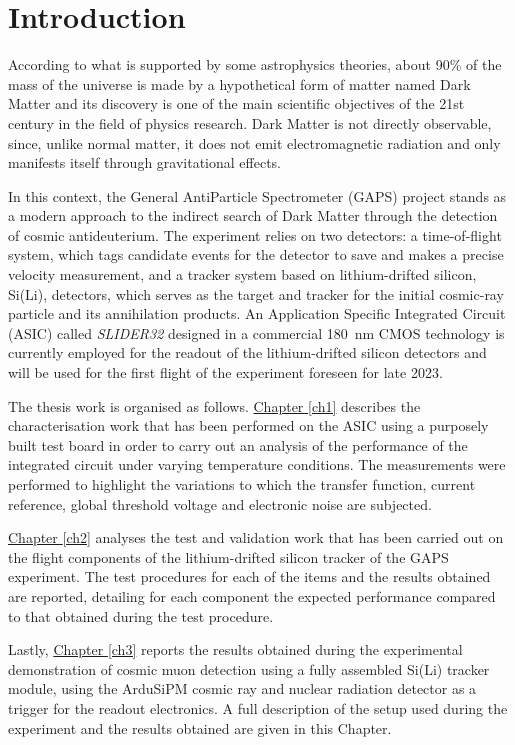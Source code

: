 \chapter*{Introduction}  %

\par
According to what is supported by some astrophysics theories, about 90\% of the mass of the universe is made by a hypothetical form of matter named Dark Matter and its discovery is one of the main scientific objectives of the 21st century in the field of physics research. Dark Matter is not directly observable, since, unlike normal matter, it does not emit electromagnetic radiation and only manifests itself through gravitational effects. 

\par
In this context, the General AntiParticle Spectrometer (GAPS) project stands as a modern approach to the indirect search of Dark Matter through the detection of cosmic antideuterium. The experiment relies on two detectors: a time-of-flight system, which tags candidate events for the detector to save and makes a precise velocity measurement, and a tracker system based on lithium-drifted silicon, Si(Li), detectors, which serves as the target and tracker for the initial cosmic-ray particle and its annihilation products. An Application Specific Integrated Circuit (ASIC) called \textit{SLIDER32} designed in a commercial \SI{180}{\nano\meter} CMOS technology is currently employed for the readout of the lithium-drifted silicon detectors and will be used for the first flight of the experiment foreseen for late 2023.

\par
The thesis work is organised as follows. \hyperref[ch1]{Chapter \ref{ch1}} describes the characterisation work that has been performed on the ASIC using a purposely built test board in order to carry out an analysis of the performance of the integrated circuit under varying temperature conditions. The measurements were performed to highlight the variations to which the transfer function, current reference, global threshold voltage and electronic noise are subjected.

\par
\hyperref[ch2]{Chapter \ref{ch2}} analyses the test and validation work that has been carried out on the flight components of the lithium-drifted silicon tracker of the GAPS experiment. The test procedures for each of the items and the results obtained are reported, detailing for each component the expected performance compared to that obtained during the test procedure.

\par
Lastly, \hyperref[ch3]{Chapter \ref{ch3}} reports the results obtained during the experimental demonstration of cosmic muon detection using a fully assembled Si(Li) tracker module, using the ArduSiPM cosmic ray and nuclear radiation detector as a trigger for the readout electronics. A full description of the setup used during the experiment and the results obtained are given in this Chapter.